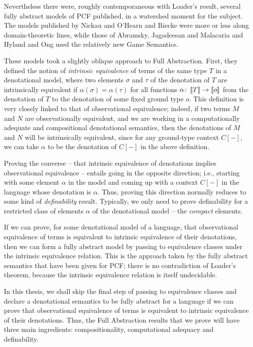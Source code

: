 Nevertheless there were, roughly contemporaneous with Loader's result, several fully abstract models of PCF published, in a watershed moment for the subject.
The models published by Nickau \cite{NickauPcf} and O'Hearn and Riecke \cite{OHearnRieckePcf} were more or less along domain-theoretic lines, while those of Abramsky, Jagadeesan and Malacaria \cite{ajmPcf} and Hyland and Ong \cite{hoPcf} used the relatively new Game Semantics.

These models took a slightly oblique approach to Full Abstraction.  
First, they defined the notion of \emph{intrinsic equivalence} of terms of the same type $T$ in a denotational model, where two elements $\sigma$ and $\tau$ of the denotation of $T$ are intrinsically equivalent if $\alpha(\sigma)=\alpha(\tau)$ for all functions $\alpha\colon\left\llbracket T\right\rrbracket\to\left\llbracket o\right\rrbracket$ from the denotation of $T$ to the denotation of some fixed ground type $o$.
This definition is very closely linked to that of observational equivalence; indeed, if two terms $M$ and $N$ are observationally equivalent, and we are working in a computationally adequate and compositional denotational semantics, then the denotations of $M$ and $N$ will be intrinsically equivalent, since for any ground-type context $C[-]$, we can take $\alpha$ to be the denotation of $C[-]$ in the above definition.

Proving the converse -- that intrinsic equivalence of denotations implies observational equivalence -- entails going in the opposite direction; i.e., starting with some element $\alpha$ in the model and coming up with a context $C[-]$ in the language whose denotation is $\alpha$.  
Thus, proving this direction normally reduces to some kind of \emph{definability} result.  
Typically, we only need to prove definability for a restricted class of elements $\alpha$ of the denotational model -- the \emph{compact} elements.

If we can prove, for some denotational model of a language, that observational equivalence of terms is equivalent to intrinsic equivalence of their denotations, then we can form a fully abstract model by passing to equivalence classes under the intrinsic equivalence relation.  
This is the approach taken by the fully abstract semantics that have been given for PCF; there is no contradiction of Loader's theorem, because the intrinsic equivalence relation is itself undecidable.

In this thesis, we shall skip the final step of passing to equivalence classes and declare a denotational semantics to be fully abstract for a language if we can prove that observational equivalence of terms is equivalent to intrinsic equivalence of their denotations.  
Thus, the Full Abstraction results that we prove will have three main ingredients: compositionality, computational adequacy and definability.

